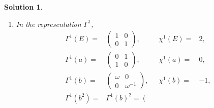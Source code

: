 \documentclass[UTF8,10pt,a4paper]{article}
\theoremstyle{Problem}
\theoremstyle{Solution}
\newtheorem*{sol}{Solution}
\begin{document}
\begin{sol}
\begin{enumerate}
            \begin{align}
                E^{-1}=&E,&a^{-1}=&a,&b^{-1}=&b^5,&(b^2)^{-1}=&b^4,&(b^3)^{-1}=&b^3,&(b^4)^{-1}=&b^2,\\
                (b^5)^{-1}=&b,&(ab)^{-1}=&ab,&(ab^2)=&ab^2,&(ab^3)^{-1}=&ab^3,&(ab^4)^{-1}=&ab^4,&(ab^5)^{-1}=&ab^5.
            \end{align}
            Constructing a class from $a$: For $X=E,a,b^3,ab^3$,
            \begin{equation}
                XaX^{-1}=a.
            \end{equation}
            For $X=b,b^4,ab^2,ab^5$,
            \begin{equation}
                XaX^{-1}=ab^4.
            \end{equation}
            For $X=b^2,b^5,ab,ab^4$,
            \begin{equation}
                XaX^{-1}=ab^2.
            \end{equation}
            The class of $G$ constructed from $a$ is $\{a,ab^2,ab^4\}$.\\
            Using the similar method, we construct all the classes of $G$:
            \[
                \mathcal{C}_1=\{E\},\quad\mathcal{C}_2=\{a,ab^2,ab^4\},\quad\mathcal{C}_3=\{b,b^5\},\quad\mathcal{C}_4=\{b^2,b^4\},\quad\mathcal{C}_5=\{b^3\},\quad\mathcal{C}_6=\{ab,ab^3,ab^5\}.
            \]
        \item[(b)] In the representation $\Gamma^1$,
        \begin{align}
            \Gamma^1(E)=&\left(\begin{matrix}
                1&0\\
                0&1
            \end{matrix}\right),&\chi^1(E)=&2,\\
            \Gamma^1(a)=&\left(\begin{matrix}
                0&1\\
                1&0
            \end{matrix}\right),&\chi^1(a)=&0,\\
            \Gamma^1(b)=&\left(\begin{matrix}
                \omega&0\\
                0&\omega^{-1}
            \end{matrix}\right),&\chi^1(b)=&-1,\\
            \Gamma^1(b^2)=&\Gamma^1(b)^2=\left(\begin{matrix}

\end{matrix}
\end{align}
\end{enumerate}
\end{sol}
\end{document}
